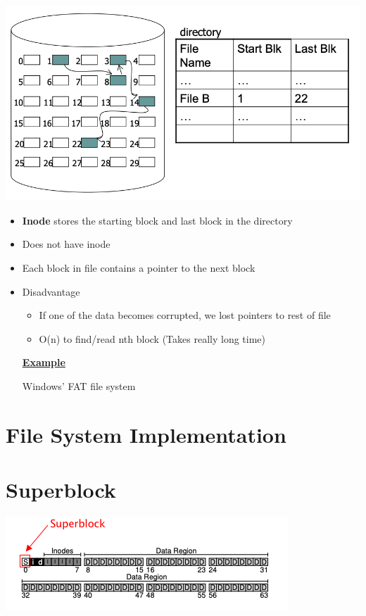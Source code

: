 \documentclass[12pt]{article}
\begin{document}
\begin{center}
\includegraphics[width=\linewidth]{../images/midterm_4_solution_47.png}
\end{center}

\begin{itemize}
    \item \textbf{Inode} stores the starting block and last block in the directory
    \item Does not have inode
    \item Each block in file contains a pointer to the next block
    \item Disadvantage
    \begin{itemize}
        \item If one of the data becomes corrupted, we lost pointers to rest of file
        \item O(n) to find/read nth block (Takes really long time)
    \end{itemize}

    \bigskip

    \underline{\textbf{Example}}

    \bigskip

    Windows' FAT file system

    \bigskip
\end{itemize}

\section{File System Implementation}

\section{Superblock}

\begin{center}
\includegraphics[width=\linewidth]{../images/midterm_2_solution_21.png}
\end{center}
\end{document}
